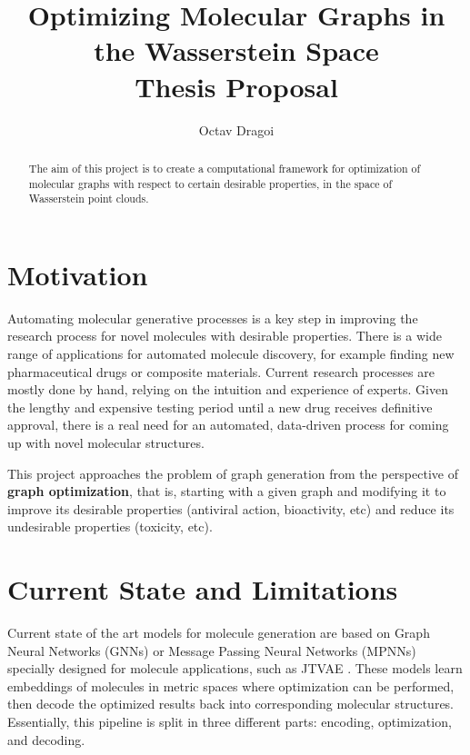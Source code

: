 \documentclass[11pt]{article}
\begin{document}
\title{Optimizing Molecular Graphs in the Wasserstein Space \\
    \large Thesis Proposal}
\author{Octav Dragoi}

\maketitle


\begin{abstract}
    The aim of this project is to create a computational framework for optimization of molecular graphs with respect to certain desirable properties, in the space of Wasserstein point clouds.
\end{abstract}

\section{Motivation}
Automating molecular generative processes is a key step in improving the research process for novel molecules with desirable properties. There is a wide range of applications for automated molecule discovery, for example finding new pharmaceutical drugs or composite materials. Current research processes are mostly done by hand, relying on the intuition and experience of experts. Given the lengthy and expensive testing period until a new drug receives definitive approval, there is a real need for an automated, data-driven process for coming up with novel molecular structures.

This project approaches the problem of graph generation from the perspective of \textbf{graph optimization}, that is, starting with a given graph and modifying it to improve its desirable properties (antiviral action, bioactivity, etc) and reduce its undesirable properties (toxicity, etc). 

\section{Current State and Limitations}
Current state of the art models for molecule generation are based on Graph Neural Networks (GNNs) or Message Passing Neural Networks (MPNNs) specially designed for molecule applications, such as JTVAE \cite{DBLP:journals/corr/abs-1802-04364}. These models learn embeddings of molecules in metric spaces where optimization can be performed, then decode the optimized results back into corresponding molecular structures. Essentially, this pipeline is split in three different parts: encoding, optimization, and decoding.
\end{document}
